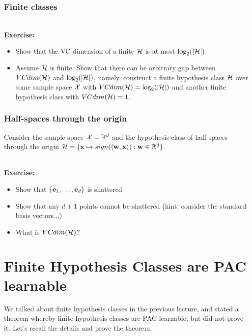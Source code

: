 \subsubsection*{Finite classes}
~\\{\bf Exercise:}
\begin{itemize}
\item Show that the VC dimension of a finite $\mathcal{H}$ is at most
$\log_2(|\mathcal{H}|)$.
\item  Assume $\mathcal{H}$ is finite. Show that there can be arbitrary gap between $VCdim(\mathcal{H})$ and
  $\log_2(|\mathcal{H}|)$, namely, construct a finite hypothesis class $\mathcal{H}$ over some sample space $\mathcal{X}$ with $VCdim(\mathcal{H}) = \log_2(|\mathcal{H}|)$ 
  and another finite hypothesis class with $VCdim(\mathcal{H})=1$.  
\end{itemize}

\subsubsection*{Half-spaces through the origin}
Consider the sample space $\mathcal{X} = \mathbb{R}^d$ and the hypothesis class of half-spaces through the origin
$\mathcal{H} = \{ {\mathbf x} \mapsto sign(\langle {\mathbf w},{\mathbf x} \rangle): {\mathbf w} \in \mathbb{R}^d\}$. 

~\\{\bf Exercise:}
\begin{itemize}
\item Show that $\{{\mathbf e}_1,\ldots,{\mathbf e}_d\}$ is shattered
\item Show that any $d+1$ points cannot be shattered (hint: consider the standard basis vectors...)
\item What is $VCdim(\mathcal{H})$?
\end{itemize}








\section{Finite Hypothesis Classes are PAC learnable}

We talked about finite hypothesis classes in the previous lecture, and stated a
theorem whereby finite hypothesis classes are PAC learnable, but did not
prove it. Let's recall the details and prove the theorem.

